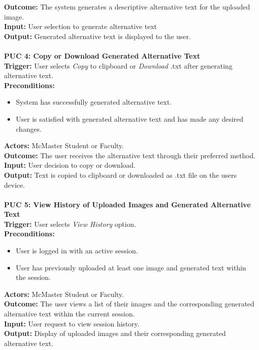 \documentclass[12pt]{article}
\begin{document}
\textbf{Outcome:} The system generates a descriptive alternative text for the uploaded image.\\
\textbf{Input:} User selection to generate alternative text\\
\textbf{Output:} Generated alternative text is displayed to the user.\\
\\
\textbf{PUC 4: Copy or Download Generated Alternative Text }\\
\textbf{Trigger:} User selects \textit{Copy} to clipboard or \textit{Download} .txt after generating alternative text.\\
\textbf{Preconditions:}
\begin{itemize}
  \item System has successfully generated alternative text.
  \item User is satisfied with generated alternative text and has made any desired changes. 
\end{itemize}
\textbf{Actors:} McMaster Student or Faculty. \\
\textbf{Outcome:} The user receives the alternative text through their preferred method. \\
\textbf{Input:} User decision to copy or download.\\
\textbf{Output:} Text is copied to clipboard or downloaded as .txt file on the users device.\\
\\
\textbf{PUC 5: View History of Uploaded Images and Generated Alternative Text}\\
\textbf{Trigger:} User selects \textit{View History} option.\\
\textbf{Preconditions:}
\begin{itemize}
  \item User is logged in with an active session. 
  \item User has previously uploaded at least one image and generated text within the session. 
\end{itemize}
\textbf{Actors:} McMaster Student or Faculty.\\
\textbf{Outcome:} The user views a list of their images and the corresponding generated alternative text within the current session. \\
\textbf{Input:} User request to view session history.\\
\textbf{Output:} Display of uploaded images and their corresponding generated alternative text.\\
\end{document}
